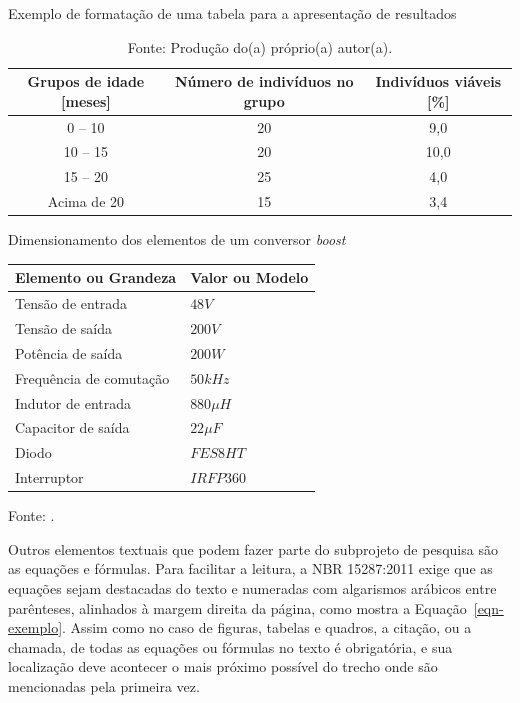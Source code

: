 \documentclass[10pt, a4paper]{article}
\begin{document}
\begin{table}[h]
	\centering
	\caption{Exemplo de formatação de uma tabela para a apresentação de resultados}
	\label{tbl-exemplo}
	\begin{tabular}{ccc}
		\hline
		\textbf{Grupos de idade [meses]} & \textbf{Número de indivíduos no grupo} & \textbf{Indivíduos viáveis [\%]} \\
		\hline
		0 -- 10		& 20	& 9,0
\\
		10 -- 15	& 20	& 10,0
\\
		15 -- 20	& 25	& 4,0
\\
		Acima de 20	& 15	& 3,4
\\
		\hline	
	\end{tabular}
	\caption*{Fonte: Produção do(a) próprio(a) autor(a).}
\end{table}

\begin{quadro}[h]
	\centering
	\caption{Dimensionamento dos elementos de um conversor \textit{boost}}
	\label{qdr-exemplo}
	\begin{tabular}{|p{60mm}|p{60mm}|}
		\hline
		\rowcolor{gray!25}
		\centering \textbf{Elemento ou Grandeza} &  \centering \textbf{Valor ou Modelo}
		\tabularnewline
		\hline
		Tensão de entrada 		& $48 V$
		\\\hline
		Tensão de saída 		& $200 V$
		\\\hline
		Potência de saída 		& $200 W$
		\\\hline
		Frequência de comutação	& $50 kHz$
		\\\hline
		Indutor de entrada 		& $880 \mu H$
	\\\hline
		Capacitor de saída 		& $22 \mu F$
	\\\hline
		Diodo					& $FES8HT$
		\\\hline
		Interruptor				& $IRFP360$	
	\\\hline
	\end{tabular}
	\caption*{Fonte: \cite{menegaz:thesis2005}.}
\end{quadro}

Outros elementos textuais que podem fazer parte do subprojeto de pesquisa são as equações e fórmulas. Para facilitar a leitura, a NBR 15287:2011 exige que as equações sejam destacadas do texto e numeradas com algarismos arábicos entre parênteses, alinhados à margem direita da página, como mostra a Equação~\eqref{eqn-exemplo}. Assim como no caso de figuras, tabelas e quadros, a citação, ou a chamada, de todas as equações ou fórmulas no texto é obrigatória, e sua localização deve acontecer o mais próximo possível do trecho onde são mencionadas pela primeira vez.
\end{document}
